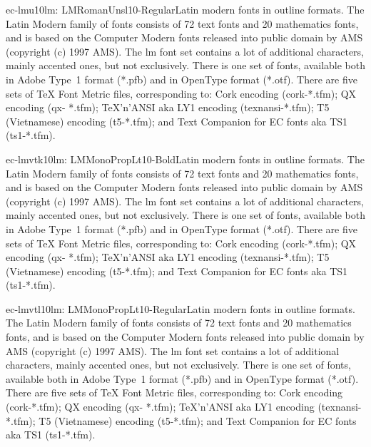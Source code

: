 \documentclass{ddltxtyp}
\begin{document}
\begin{package}{ec-lmu10}{lm: LMRomanUnsl10-Regular}{Latin modern fonts in outline formats.}
The Latin Modern family of fonts consists of 72 text fonts and
20 mathematics fonts, and is based on the Computer Modern fonts
released into public domain by AMS (copyright (c) 1997 AMS).
The lm font set contains a lot of additional characters, mainly
accented ones, but not exclusively. There is one set of fonts,
available both in Adobe Type~1 format (*.pfb) and in OpenType
format (*.otf). There are five sets of {\TeX} Font Metric files,
corresponding to: Cork encoding (cork-*.tfm); QX encoding (qx-
*.tfm); {\TeX}'n'ANSI aka LY1 encoding (texnansi-*.tfm); T5
(Vietnamese) encoding (t5-*.tfm); and Text Companion for EC
fonts aka TS1 (ts1-*.tfm).
\end{package}
\begin{package}{ec-lmvtk10}{lm: LMMonoPropLt10-Bold}{Latin modern fonts in outline formats.}
The Latin Modern family of fonts consists of 72 text fonts and
20 mathematics fonts, and is based on the Computer Modern fonts
released into public domain by AMS (copyright (c) 1997 AMS).
The lm font set contains a lot of additional characters, mainly
accented ones, but not exclusively. There is one set of fonts,
available both in Adobe Type~1 format (*.pfb) and in OpenType
format (*.otf). There are five sets of {\TeX} Font Metric files,
corresponding to: Cork encoding (cork-*.tfm); QX encoding (qx-
*.tfm); {\TeX}'n'ANSI aka LY1 encoding (texnansi-*.tfm); T5
(Vietnamese) encoding (t5-*.tfm); and Text Companion for EC
fonts aka TS1 (ts1-*.tfm).
\end{package}
\begin{package}{ec-lmvtl10}{lm: LMMonoPropLt10-Regular}{Latin modern fonts in outline formats.}
The Latin Modern family of fonts consists of 72 text fonts and
20 mathematics fonts, and is based on the Computer Modern fonts
released into public domain by AMS (copyright (c) 1997 AMS).
The lm font set contains a lot of additional characters, mainly
accented ones, but not exclusively. There is one set of fonts,
available both in Adobe Type~1 format (*.pfb) and in OpenType
format (*.otf). There are five sets of {\TeX} Font Metric files,
corresponding to: Cork encoding (cork-*.tfm); QX encoding (qx-
*.tfm); {\TeX}'n'ANSI aka LY1 encoding (texnansi-*.tfm); T5
(Vietnamese) encoding (t5-*.tfm); and Text Companion for EC
fonts aka TS1 (ts1-*.tfm).
\end{package}
\end{document}

